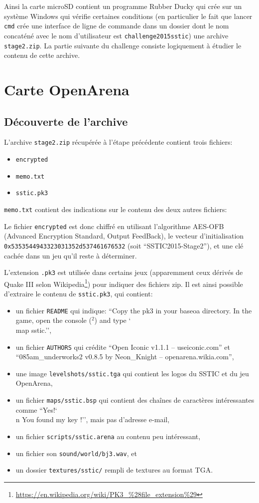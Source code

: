 \documentclass[a4paper,10pt]{article}
\newcommand{\bksl}{\char`\\} %
\begin{document}
Ainsi la carte microSD contient un programme Rubber Ducky qui crée sur un système Windows qui vérifie certaines conditions (en particulier le fait que lancer \texttt{cmd} crée une interface de ligne de commande dans un dossier dont le nom concaténé avec le nom d'utilisateur est \texttt{challenge2015sstic}) une archive \texttt{stage2.zip}.
La partie suivante du challenge consiste logiquement à étudier le contenu de cette archive.

\clearpage
\section{Carte OpenArena}

\subsection{Découverte de l'archive}

L'archive \texttt{stage2.zip} récupérée à l'étape précédente contient trois fichiers:
\begin{itemize}
  \item \texttt{encrypted}
  \item \texttt{memo.txt}
  \item \texttt{sstic.pk3}
\end{itemize}

\texttt{memo.txt} contient des indications sur le contenu des deux autres fichiers:


Le fichier \texttt{encrypted} est donc chiffré en utilisant l'algorithme AES-OFB (Advanced Encryption Standard, Output FeedBack), le vecteur d'initialisation \texttt{0x5353544943323031352d537461676532} (soit ``SSTIC2015-Stage2''), et une clé cachée dans un jeu qu'il reste à déterminer.

L'extension \texttt{.pk3} est utilisée dans certains jeux (apparemment ceux dérivés de Quake III selon Wikipedia\footnote{\url{https://en.wikipedia.org/wiki/PK3_\%28file_extension\%29}}) pour indiquer des fichiers zip.
Il est ainsi possible d'extraire le contenu de \texttt{sstic.pk3}, qui contient:
\begin{itemize}
  \item un fichier \texttt{README} qui indique: ``Copy the pk3 in your baseoa directory.
In the game, open the console ($^2$) and type \bksl{}map sstic.'',
  \item un fichier \texttt{AUTHORS} qui crédite ``Open Iconic v1.1.1 -- useiconic.com'' et ``085am\_underworks2 v0.8.5 by Neon\_Knight -- openarena.wikia.com'',
  \item une image \texttt{levelshots/sstic.tga} qui contient les logos du SSTIC et du jeu OpenArena,
  \item un fichier \texttt{maps/sstic.bsp} qui contient des chaînes de caractères intéressantes comme ``Yes!\bksl{}n You found my key !'', mais pas d'adresse e-mail,
  \item un fichier \texttt{scripts/sstic.arena} au contenu peu intéressant,
  \item un fichier son \texttt{sound/world/bj3.wav}, et
  \item un dossier \texttt{textures/sstic/} rempli de textures au format TGA.
\end{itemize}
\end{document}
